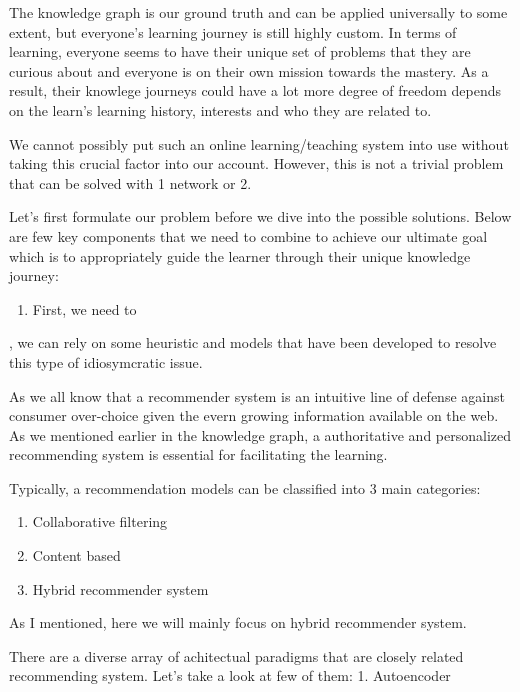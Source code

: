 \documentclass[]{book}
\providecommand{\tightlist}{%
  \setlength{\itemsep}{0pt}\setlength{\parskip}{0pt}}
\theoremstyle{definition}
\theoremstyle{definition}
\theoremstyle{definition}
\theoremstyle{remark}
\begin{document}
The knowledge graph is our ground truth and can be applied universally
to some extent, but everyone's learning journey is still highly custom.
In terms of learning, everyone seems to have their unique set of
problems that they are curious about and everyone is on their own
mission towards the mastery. As a result, their knowlege journeys could
have a lot more degree of freedom depends on the learn's learning
history, interests and who they are related to.

We cannot possibly put such an online learning/teaching system into use
without taking this crucial factor into our account. However, this is
not a trivial problem that can be solved with 1 network or 2.

Let's first formulate our problem before we dive into the possible
solutions. Below are few key components that we need to combine to
achieve our ultimate goal which is to appropriately guide the learner
through their unique knowledge journey:

\begin{enumerate}
\def\labelenumi{\arabic{enumi}.}
\tightlist
\item
  First, we need to
\end{enumerate}

, we can rely on some heuristic and models that have been developed to
resolve this type of idiosymcratic issue.

As we all know that a recommender system is an intuitive line of defense
against consumer over-choice given the evern growing information
available on the web. As we mentioned earlier in the knowledge graph, a
authoritative and personalized recommending system is essential for
facilitating the learning.

Typically, a recommendation models can be classified into 3 main
categories:

\begin{enumerate}
\def\labelenumi{\arabic{enumi}.}
\item
  Collaborative filtering
\item
  Content based
\item
  Hybrid recommender system
\end{enumerate}

As I mentioned, here we will mainly focus on hybrid recommender system.

There are a diverse array of achitectual paradigms that are closely
related recommending system. Let's take a look at few of them: 1.
Autoencoder
\end{document}
